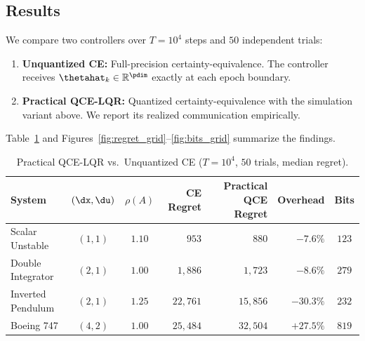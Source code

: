 \documentclass[11pt,journal,onecolumn]{IEEEtran}
\newcommand{\R}{\mathbb{R}}
\begin{document}
\subsection{Results}

We compare two controllers over $T = 10^4$ steps and $50$ independent trials:
\begin{enumerate}[itemsep=2pt]
    \item \textbf{Unquantized CE:} Full-precision certainty-equivalence. The controller receives $\thetahat_k \in \R^{\pdim}$ exactly at each epoch boundary.
    \item \textbf{Practical QCE-LQR:} Quantized certainty-equivalence with the simulation variant above. We report its realized communication empirically.
\end{enumerate}
Table~\ref{tab:results} and Figures~\ref{fig:regret_grid}--\ref{fig:bits_grid} summarize the findings.

\begin{table}[h]
\centering
\renewcommand{\arraystretch}{1.15}
\caption{Practical QCE-LQR vs.\ Unquantized CE ($T=10^4$, $50$ trials, median regret).}
\label{tab:results}
\begin{tabular}{lccrrrc}
\hline
System & $(\dx,\du)$ & $\rho(A)$ & CE Regret & Practical QCE Regret & Overhead & Bits \\
\hline
Scalar Unstable   & $(1,1)$ & $1.10$ & $953$       & $880$       & $-7.6\%$  & $123$   \\
Double Integrator & $(2,1)$ & $1.00$ & $1{,}886$   & $1{,}723$   & $-8.6\%$  & $279$   \\
Inverted Pendulum & $(2,1)$ & $1.25$ & $22{,}761$  & $15{,}856$  & $-30.3\%$ & $232$  \\
Boeing 747        & $(4,2)$ & $1.00$ & $25{,}484$  & $32{,}504$  & $+27.5\%$ & $819$ \\
\hline
\end{tabular}
\end{table}
\end{document}

